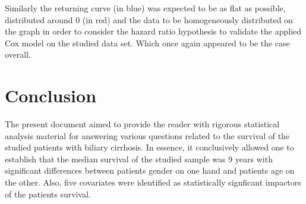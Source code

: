 \documentclass[]{article}
\begin{document}
Similarly the returning curve (in blue) was expected to be as flat as
possible, distributed around 0 (in red) and the data to be homogeneously
distributed on the graph in order to consider the hazard ratio
hypothesis to validate the applied Cox model on the studied data set.
Which once again appeared to be the case overall.

\section{Conclusion}\label{conclusion}

The present document aimed to provide the reader with rigorous
statistical analysis material for answering various questions related to
the survival of the studied patients with biliary cirrhosis. In essence,
it conclusively allowed one to establish that the median survival of the
studied sample was 9 years with significant differences between patients
gender on one hand and patients age on the other. Also, five covariates
were identified as statistically signficant impactors of the patients
survival.
\end{document}
